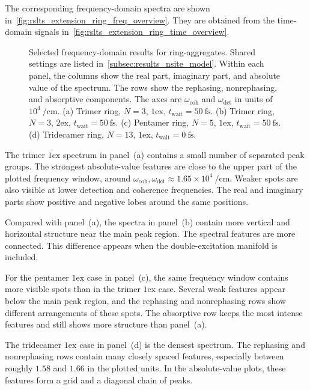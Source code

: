 The corresponding frequency-domain spectra are shown in~\autoref{fig:rslts_extension_ring_freq_overview}. They are obtained from the time-domain signals in~\autoref{fig:rslts_extension_ring_time_overview}.

\begin{figure}[htbp]
  \centering
  \caption{Selected frequency-domain results for ring-aggregates. Shared settings are listed in~\autoref{subsec:results_nsite_model}. Within each panel, the columns show the real part, imaginary part, and absolute value of the spectrum. The rows show the rephasing, nonrephasing, and absorptive components. The axes are \(\omega_{\mathrm{coh}}\) and \(\omega_{\mathrm{det}}\) in units of \(10^{4}~\si{\per\centi\metre}\). (a) Trimer ring, \(N=3\), \(1\mathrm{ex}\), \(t_{\mathrm{wait}}=\SI{50}{\femto\second}\). (b) Trimer ring, \(N=3\), \(2\mathrm{ex}\), \(t_{\mathrm{wait}}=\SI{50}{\femto\second}\). (c) Pentamer ring, \(N=5\), \(1\mathrm{ex}\), \(t_{\mathrm{wait}}=\SI{50}{\femto\second}\). (d) Tridecamer ring, \(N=13\), \(1\mathrm{ex}\), \(t_{\mathrm{wait}}=\SI{0}{\femto\second}\).}
  \label{fig:rslts_extension_ring_freq_overview}
\end{figure}

The trimer \(1\mathrm{ex}\) spectrum in panel~(a) contains a small number of separated peak groups. The strongest absolute-value features are close to the upper part of the plotted frequency window, around \(\omega_{\mathrm{coh}},\omega_{\mathrm{det}}\approx 1.65\times 10^{4}~\si{\per\centi\metre}\). Weaker spots are also visible at lower detection and coherence frequencies. The real and imaginary parts show positive and negative lobes around the same positions.

Compared with panel~(a), the spectra in panel~(b) contain more vertical and horizontal structure near the main peak region. The spectral features are more connected. This difference appears when the double-excitation manifold is included.

For the pentamer \(1\mathrm{ex}\) case in panel~(c), the same frequency window contains more visible spots than in the trimer \(1\mathrm{ex}\) case. Several weak features appear below the main peak region, and the rephasing and nonrephasing rows show different arrangements of these spots. The absorptive row keeps the most intense features and still shows more structure than panel~(a).

The tridecamer \(1\mathrm{ex}\) case in panel~(d) is the densest spectrum. The rephasing and nonrephasing rows contain many closely spaced features, especially between roughly \(1.58\) and \(1.66\) in the plotted units. In the absolute-value plots, these features form a grid and a diagonal chain of peaks.

